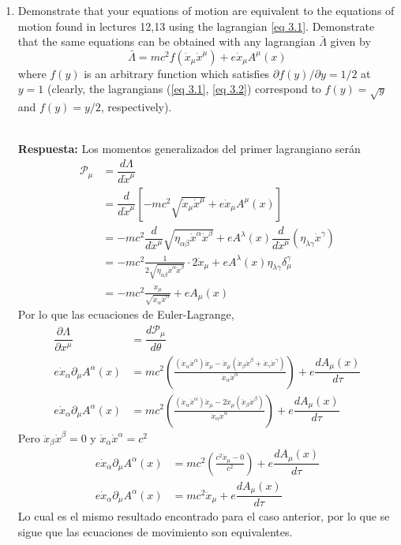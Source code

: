 \documentclass[]{article}
\numberwithin{equation}{section}
\newcommand{\0}{\textcolor{gray}{0}}
\newcommand{\pd}[2]{\dfrac{\partial #1}{\partial #2}}
\newcommand{\lpd}[2]{\partial #1/\partial #2}
\newcommand{\td}[2]{\dfrac{d #1}{d #2}}
\newcommand{\resp}{
	\\
	
	\textbf{Respuesta:} }
\begin{document}
\begin{enumerate}
	\item[(c)] Demonstrate that your equations of motion are equivalent to the equations of motion found in lectures 12,13 using the lagrangian \ref{eq 3.1}. Demonstrate that the same equations can be obtained with any lagrangian $\bar{\Lambda}$ given by
	\begin{equation}
		\bar{\Lambda} = m c^2 f(\dot{x}_\mu \dot{x}^\mu) + e \dot{x}_\mu A^\mu (x)  \label{eq 3.3}
	\end{equation}
	where $f (y)$ is an arbitrary function which satisfies $\lpd{f(y)}{y} = 1/2$ at $y = 1$ (clearly, the lagrangians (\ref{eq 3.1}, \ref{eq 3.2}) correspond to $f (y) = \sqrt{y}$ and $f (y) = y/2$, respectively).
	\resp Los momentos generalizados del primer lagrangiano serán
	\begin{align*}
		\mathcal{P}_\mu &= \td{\Lambda}{\dot{x}^\mu}\\
		&= \td{}{\dot{x}^\mu} \left[-mc^2 \sqrt{\dot{x}_\mu \dot{x}^\mu} + e \dot{x}_\mu A^\mu (x) \right]\\
		&= -mc^2 \td{}{\dot{x}^\mu} \sqrt{\eta_{\alpha\beta} \dot{x}^\alpha \dot{x}^\beta} + e A^\lambda (x) \td{}{\dot{x}^\mu} \left(\eta_{\lambda\gamma} \dot{x}^\gamma\right)\\
		&= -mc^2 \frac{1}{2 \sqrt{\eta_{\alpha\beta} \dot{x}^\alpha \dot{x}^\beta}} \cdot 2\dot{x}_\mu + e A^\lambda (x) \eta_{\lambda\gamma} \delta_\mu^\gamma\\
		&= -mc^2 \frac{\dot{x}_\mu}{\sqrt{\dot{x}_\alpha \dot{x}^\alpha}} + e A_\mu (x)
	\end{align*}
	Por lo que las ecuaciones de Euler-Lagrange,
	\begin{align*}
		\pd{\Lambda}{x^\mu} &= \td{\mathcal{P}_\mu}{\theta}\\
		e\dot{x}_\alpha \partial_\mu A^\alpha (x) &= mc^2 \left(\frac{(\dot{x}_\alpha \dot{x}^\alpha) \ddot{x}_\mu - \dot{x}_\mu (\ddot{x}_\beta \dot{x}^\beta + \dot{x}_\gamma \ddot{x}^\gamma) }{\dot{x}_\alpha \dot{x}^\alpha}\right) + e \td{A_\mu (x)}{\tau}\\
		e\dot{x}_\alpha \partial_\mu A^\alpha (x) &= mc^2 \left(\frac{(\dot{x}_\alpha \dot{x}^\alpha) \ddot{x}_\mu - 2 \dot{x}_\mu (\ddot{x}_\beta \dot{x}^\beta) }{\dot{x}_\alpha \dot{x}^\alpha}\right) + e \td{A_\mu (x)}{\tau}
	\end{align*}
	Pero $\ddot{x}_\beta \dot{x}^\beta = 0$ y $\dot{x}_\alpha \dot{x}^\alpha = c^2$
	\begin{align*}
		e\dot{x}_\alpha \partial_\mu A^\alpha (x) &= mc^2 \left(\frac{c^2 \ddot{x}_\mu - 0}{c^2}\right) + e \td{A_\mu (x)}{\tau}\\
		e\dot{x}_\alpha \partial_\mu A^\alpha (x) &= mc^2 \ddot{x}_\mu + e \td{A_\mu (x)}{\tau}
	\end{align*}
	Lo cual es el mismo resultado encontrado para el caso anterior, por lo que se sigue que las ecuaciones de movimiento son equivalentes.
	

\end{enumerate}
\end{document}
